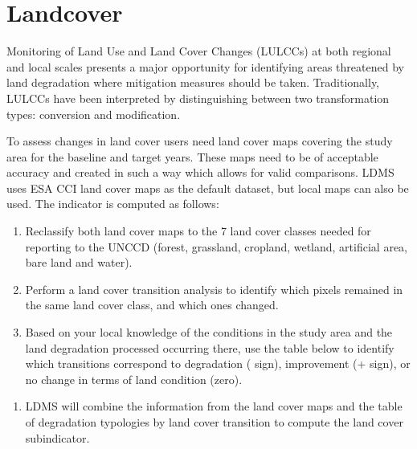 \documentclass[letterpaper,10pt,english]{sphinxmanual}
\begin{document}


\section{Landcover}
\label{\detokenize{Background/SDG_indicators:landcover}}
\sphinxAtStartPar
Monitoring of Land Use and Land Cover Changes (LULCCs) at both regional and local scales presents a major opportunity for identifying areas threatened by land degradation where mitigation measures should be taken. Traditionally, LULCCs have been interpreted by distinguishing between two transformation types: conversion and modification.

\sphinxAtStartPar
To assess changes in land cover users need land cover maps covering the study
area for the baseline and target years. These maps need to be of acceptable
accuracy and created in such a way which allows for valid comparisons.
LDMS uses ESA CCI land cover maps as the default dataset, but local
maps can also be used. The indicator is computed as follows:
\begin{enumerate}
%
\item {} 
\sphinxAtStartPar
Reclassify both land cover maps to the 7 land cover classes needed for
reporting to the UNCCD (forest, grassland, cropland, wetland, artificial
area, bare land and water).

\item {} 
\sphinxAtStartPar
Perform a land cover transition analysis to identify which pixels remained
in the same land cover class, and which ones changed.

\item {} 
\sphinxAtStartPar
Based on your local knowledge of the conditions in the study area and the
land degradation processed occurring there, use the table below to identify
which transitions correspond to degradation (\sphinxhyphen{} sign), improvement (+ sign),
or no change in terms of land condition (zero).

\end{enumerate}

\begin{enumerate}
%
\item {} 
\sphinxAtStartPar
LDMS will combine the information from the land cover maps and the
table of degradation typologies by land cover transition to compute the land
cover sub\sphinxhyphen{}indicator.

\end{enumerate}
\end{document}
